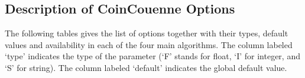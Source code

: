 \subsection{Description of CoinCouenne Options}
\label{sub:couenneoptions}

The following tables gives the list of options together with their types, default values and availability in each of the four main algorithms.
The column labeled `type' indicates the type of the parameter (`F' stands for float, `I' for integer, and `S' for
string).
The column labeled `default' indicates the global default value.

